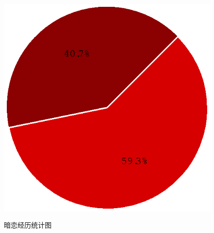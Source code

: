 \documentclass[10pt, a4paper, twocolumn]{ctexart}
\begin{document}
\begin{figure}[htbp]
{	\includegraphics[width = 0.8\linewidth]{c8.eps}
	}
	\caption{暗恋经历统计图} %
\end{figure}
\end{document}
